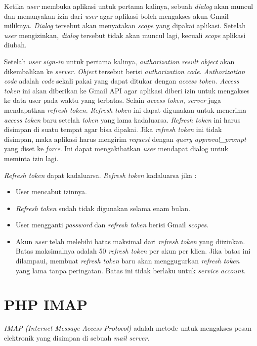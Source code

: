 Ketika \textit{user} membuka aplikasi untuk pertama kalinya, sebuah \textit{dialog} akan muncul dan menanyakan izin dari \textit{user} agar aplikasi boleh mengakses akun Gmail miliknya. \textit{Dialog} tersebut akan menyatakan \textit{scope} yang dipakai aplikasi. Setelah \textit{user} mengizinkan, \textit{dialog} tersebut tidak akan muncul lagi, kecuali \textit{scope} aplikasi diubah.

Setelah \textit{user sign-in} untuk pertama kalinya, \textit{authorization result object} akan dikembalikan ke \textit{server}. \textit{Object} tersebut berisi \textit{authorization code}. \textit{Authorization code} adalah \textit{code} sekali pakai yang dapat ditukar dengan \textit{access token. Access token} ini akan diberikan ke Gmail API agar aplikasi diberi izin untuk mengakses ke data user pada waktu yang terbatas. Selain \textit{access token}, \textit{server} juga mendapatkan \textit{refresh token. Refresh token} ini dapat digunakan untuk menerima \textit{access token} baru setelah \textit{token} yang lama kadaluarsa. \textit{Refresh token} ini harus disimpan di suatu tempat agar bisa dipakai. Jika \textit{refresh token} ini tidak disimpan, maka aplikasi harus mengirim \textit{request} dengan \textit{query approval\_prompt} yang diset ke \textit{force}. Ini dapat mengakibatkan \textit{user} mendapat dialog untuk meminta izin lagi.

\textit{Refresh token} dapat kadaluarsa. \textit{Refresh token} kadaluarsa jika :
\begin{itemize}
\item User mencabut izinnya.
\item \textit{Refresh token} sudah tidak digunakan selama enam bulan.
\item User mengganti \textit{password} dan \textit{refresh token} berisi Gmail \textit{scopes}.
\item Akun \textit{user} telah melebihi batas maksimal dari \textit{refresh token} yang diizinkan. Batas maksimalnya adalah 50 \textit{refresh token} per akun per klien. Jika batas ini dilampaui, membuat \textit{refresh token} baru akan menggugurkan \textit{refresh token} yang lama tanpa peringatan. Batas ini tidak berlaku untuk \textit{service account}.
\end{itemize}

\section{PHP IMAP ~\cite{php-imap}}
\label{sec:PHPIMAP}
\textit{IMAP (Internet Message Access Protocol)} adalah metode untuk mengakses pesan elektronik yang disimpan di sebuah \textit{mail server}.

